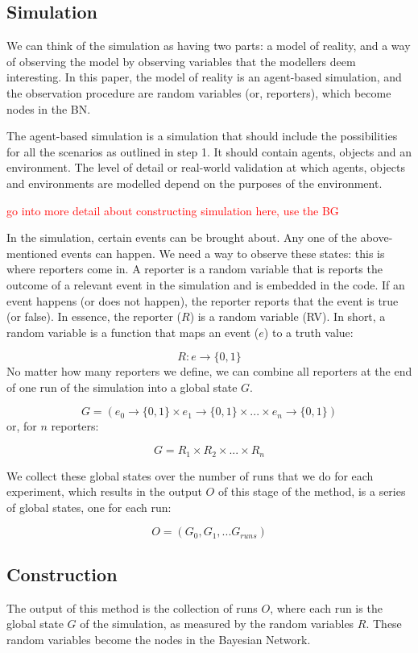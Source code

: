 \documentclass[12pt]{article}
\begin{document}
\subsection{Simulation}
We can think of the simulation as having two parts: a model of reality, and a way of observing the model by observing variables that the modellers deem interesting. In this paper, the model of reality is an agent-based simulation, and the observation procedure are random variables (or, reporters), which become nodes in the BN.

The agent-based simulation is a simulation that should include the possibilities for all the scenarios as outlined in step 1. It should contain agents, objects and an environment. The level of detail or real-world validation at which agents, objects and environments are modelled depend on the purposes of the environment.

 \textcolor{red} {go into more detail about constructing simulation here, use the BG}



In the simulation, certain events can be brought about. Any one of the above-mentioned events can happen. We need a way to observe these states: this is where reporters come in. A reporter is a random variable that is reports the outcome of a relevant event in the simulation and is embedded in the code. If an event happens (or does not happen), the reporter reports that the event is true (or false). In essence, the reporter ($R$) is a random variable (RV). In short, a random variable is a function that maps an event ($e$) to a truth value:

\[ R : e \rightarrow \{0, 1\} \]
No matter how many reporters we define, we can combine all reporters at the end of one run of the simulation into a global state $G$.

\[ G = (e_0 \rightarrow \{0, 1\} \times e_1 \rightarrow \{0, 1\} \times ... \times e_n \rightarrow \{0, 1\})\]
 or, for $n$ reporters:
 
\[ G = R_1 \times R_2 \times... \times R_n\]

We collect these global states over the number of runs that we do for each experiment, which results in the output $O$ of this stage of the method, is a series of global states, one for each run:

\[ O = (G_0, G_1, ... G_{runs})\]


\subsection{Construction}
The output of this method is the collection of runs $O$, where each run is the global state $G$ of the simulation, as measured by the random variables $R$. These random variables become the nodes in the Bayesian Network.
\end{document}
